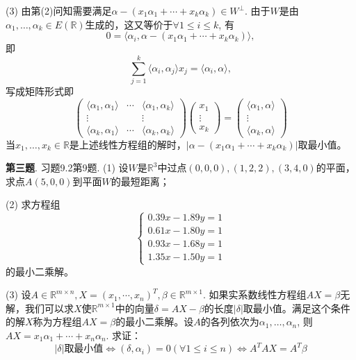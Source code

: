 (3) 由第(2)问知需要满足$\alpha - (x_1\alpha_1 + \cdots + x_k\alpha_k) \in W^{\perp}$. 由于$W$是由$\alpha_1, \ldots, \alpha_k \in E(\mathbb{R})$生成的，这又等价于$\forall 1 \leqslant i \leqslant k$, 有
$$0 = \langle \alpha_i, \alpha - (x_1\alpha_1 + \cdots + x_k\alpha_k) \rangle,$$
即
$$\sum\limits_{j=1}^k \langle \alpha_i, \alpha_j \rangle x_j = \langle \alpha_i, \alpha \rangle,$$
写成矩阵形式即
$$
\begin{pmatrix}
\langle \alpha_1, \alpha_1 \rangle & \cdots & \langle \alpha_1, \alpha_k \rangle \\
\vdots & & \vdots \\
\langle \alpha_k, \alpha_1 \rangle & \cdots & \langle \alpha_k, \alpha_k \rangle
\end{pmatrix}
\begin{pmatrix}
x_1 \\ \vdots \\ x_k
\end{pmatrix} = 
\begin{pmatrix}
\langle \alpha_1, \alpha \rangle \\
\vdots \\
\langle \alpha_k, \alpha \rangle
\end{pmatrix}
$$
当$x_1, \ldots, x_k \in \mathbb{R}$是上述线性方程组的解时，$\lvert \alpha - (x_1\alpha_1 + \cdots + x_k\alpha_k) \rvert$取最小值。


\newpageorvspace


{\bf 第三题}. 习题9.2第9题. (1) 设$W$是$\mathbb{R}^3$中过点$(0,0,0), (1,2,2), (3,4,0)$的平面，求点$A (5,0,0)$到平面$W$的最短距离；

(2) 求方程组
$$
\begin{cases}
0.39x - 1.89y = 1 \\
0.61x - 1.80y = 1 \\
0.93x - 1.68y = 1 \\
1.35x - 1.50y = 1
\end{cases}
$$
的最小二乘解。

(3) 设$A\in\mathbb{R}^{m\times n}, X = (x_1,\cdots,x_n)^T, \beta\in\mathbb{R}^{m\times 1}$. 如果实系数线性方程组$AX = \beta$无解，我们可以求$X$使$\mathbb{R}^{m\times 1}$中的向量$\delta = AX - \beta$的长度$\lvert \delta \rvert$取最小值。满足这个条件的解$X$称为方程组$AX = \beta$的最小二乘解。设$A$的各列依次为$\alpha_1, \ldots, \alpha_n$, 则$AX = x_1\alpha_1 + \cdots + x_n\alpha_n$. 求证：
$$\lvert \delta \rvert \text{取最小值} \Longleftrightarrow (\delta, \alpha_i) = 0 (\forall 1\leqslant i \leqslant n) \Longleftrightarrow A^TAX = A^T\beta$$

